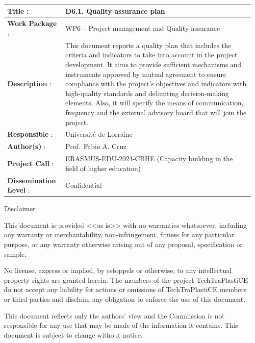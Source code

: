 \documentclass[
  12pt,
  oneside]{book}
\begin{document}
\begin{frontmatter}
\begin{titlepage}
  \vfill

  \begin{tabular}{ >{\raggedright\arraybackslash}p{3.5cm}| p{12.5cm} }
    \toprule
    \textbf{Title} : & D6.1. Quality assurance plan  \\ \cmidrule{2-2}  
    \textbf{Work Package} : & WP6 -- Project management and Quality
  assurance  \\ \cmidrule{2-2}
    \textbf{Description} : & This document reports a quality plan that
  includes the criteria and indicators to take into account in the
  project development. It aims to provide sufficient mechanisms and
  instruments approved by mutual agreement to ensure compliance with the
  project's objectives and indicators with high-quality standards and
  delimiting decision-making elements. Also, it will specify the means
  of communication, frequency and the external advisory board that will
  join the project.  \\ \cmidrule{2-2}
    \textbf{Responsible} : & Université de Lorraine  \\ \cmidrule{2-2}
    \textbf{Author(s)} : &  Prof.~Fabio A. Cruz ~ \\ \cmidrule{2-2}
    \textbf{Project Call} : & ERASMUS-EDU-2024-CBHE (Capacity building in the field of higher education)  \\ \cmidrule{2-2}
    \textbf{Dissemination Level} : & Confidential\\ 
  \bottomrule
  \end{tabular}

  \vfill


  

    
    
    \vfill
    
    {\scriptsize\centering\color{lightgray} 
    
    Disclaimer
    
    This document is provided <<as is>> with no warranties whatsoever, 
    including any warranty or merchantability, non-infringement, fitness for any particular 
    purpose, or any warranty otherwise arising out of any proposal, specification or sample.  
    
    No license, express or implied, by estoppels or otherwise, to any intellectual 
    property rights are granted herein. 
    The members of the project TechTraPlastiCE do not accept any liability for actions or 
    omissions of TechTraPlastiCE members or third parties and disclaim any obligation 
    to enforce the use of this document. 
    
    This document reflects only the authors' view and the Commission is not responsible 
    for any use that may be made of the information it contains.  
    This document is subject to change without notice. 
    
    }
    \normalsize
    
    
    
      \end{titlepage}
  \end{frontmatter}
\end{document}
